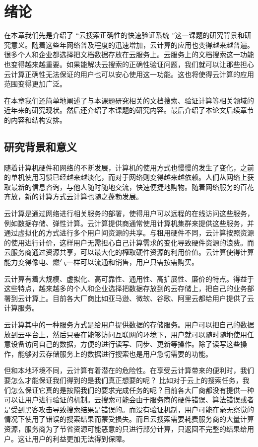 \chapter{绪论}
\label{chap:introduction}

在本章我们先是介绍了
“云搜索正确性的快速验证系统
”这一课题的研究背景和研究意义。随着这些年网络普及程度的迅速增加，云计算的应用也变得越来越普遍。很多个人和企业都选择把文档数据存放在云服务上。云服务上的文档搜索这一功能也变得越来越重要。如果能解决云搜索的正确性验证问题，我们就可以让那些担心云计算正确性无法保证的用户也可以安心使用这一功能。这也将使得云计算的应用范围变得更加广泛。

在本章我们还简单地阐述了与本课题研究相关的文档搜索、验证计算等相关领域的近年来的研究现状。然后还介绍了本课题的研究内容。最后介绍了本论文后续章节的内容和结构安排。

\section{研究背景和意义}
随着计算机硬件和网络的不断发展，计算机的使用方式也慢慢的发生了变化，之前的单机使用习惯已经越来越淡化，而对于网络则变得越来越依赖。人们从网络上获取最新的信息咨询，与他人随时随地交流，快速便捷地购物。随着网络服务的百花齐放，新的计算方式云计算也随之蓬勃发展。

云计算是通过网络进行相关服务的部署，使得用户可以远程的在线访问这些服务，例如数据存储、弹性计算。云计算提供商通常使用计算机集群来提供这些服务，并通过虚拟化的方式进行多个用户间资源的共享。与租用硬件不同，云计算按照资源的使用进行计价，这样用户无需担心自己计算需求的变化导致硬件资源的浪费。而云服务商通过资源共享，可以最大化的榨取硬件资源的利用价值。云计算使得计算能力变得像电、燃气一样可以流通和销售，用户只需按需购买。

云计算有着大规模、虚拟化、高可靠性、通用性、高扩展性、廉价的特点。得益于这些特点，越来越多的个人和企业选择把数据存放到的云存储上，把自己的业务部署到云计算上。目前各大厂商比如亚马逊、微软、谷歌、阿里云都给用户提供了云计算服务。

云计算其中的一种服务方式是给用户提供数据的存储服务。用户可以把自己的数据放到云平台上，然后只要在能够访问互联网的环境下，用户就可以随时随地使用任意设备访问自己的数据，方便的进行读写、同步、更新等操作。除了读写这些操作，能够对云存储服务上的数据进行搜索也是用户急切需要的功能。

但和本地环境不同，云计算有着潜在的危险性。在享受云计算带来的便利时，我们要怎么才能保证我们得到的是我们真正想要的呢？
比如对于云上的搜索任务，我们怎么保证它真的是按照我们的要求完成任务的呢？目前各大厂商都没有提供一种可以让用户进行验证的机制。云搜索可能会由于服务商的硬件错误、算法错误或者是受到黑客攻击导致搜索结果是错误的。而没有验证机制，用户可能在毫无察觉的情况下使用了错误的搜索结果而蒙受损失。而且云搜索需要耗费服务商的大量计算资源，服务商为了节省资源可能恶意的只进行部分计算，只返回不完整的结果给用户。这让用户的利益更加无法得到保障。

